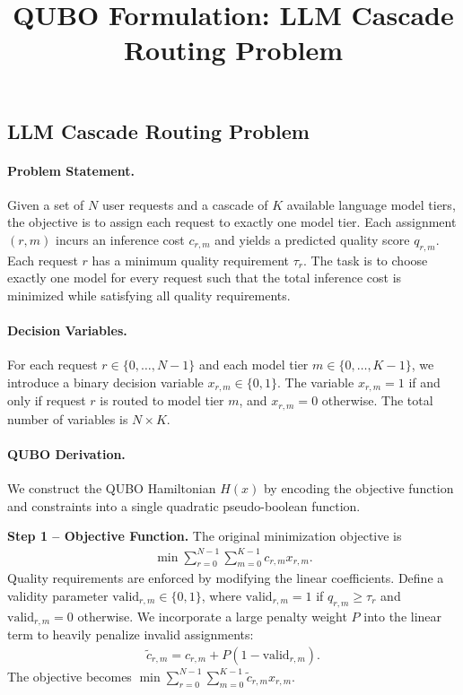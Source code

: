 \documentclass[12pt]{article}
\title{QUBO Formulation: LLM Cascade Routing Problem}
\date{}
\begin{document}
\maketitle

\subsection*{LLM Cascade Routing Problem}

\paragraph{Problem Statement.}
Given a set of $N$ user requests and a cascade of $K$ available language model tiers, the objective is to assign each request to exactly one model tier. Each assignment $(r, m)$ incurs an inference cost $c_{r,m}$ and yields a predicted quality score $q_{r,m}$. Each request $r$ has a minimum quality requirement $\tau_r$. The task is to choose exactly one model for every request such that the total inference cost is minimized while satisfying all quality requirements.

\paragraph{Decision Variables.}
For each request $r \in \{0, \dots, N-1\}$ and each model tier $m \in \{0, \dots, K-1\}$, we introduce a binary decision variable $x_{r,m} \in \{0, 1\}$. The variable $x_{r,m} = 1$ if and only if request $r$ is routed to model tier $m$, and $x_{r,m} = 0$ otherwise. The total number of variables is $N \times K$.

\paragraph{QUBO Derivation.}
We construct the QUBO Hamiltonian $H(x)$ by encoding the objective function and constraints into a single quadratic pseudo-boolean function.

\textbf{Step 1 -- Objective Function.} The original minimization objective is
\begin{align}
    \min \sum_{r=0}^{N-1} \sum_{m=0}^{K-1} c_{r,m} x_{r,m}.
\end{align}
Quality requirements are enforced by modifying the linear coefficients. Define a validity parameter $\text{valid}_{r,m} \in \{0, 1\}$, where $\text{valid}_{r,m} = 1$ if $q_{r,m} \ge \tau_r$ and $\text{valid}_{r,m} = 0$ otherwise. We incorporate a large penalty weight $P$ into the linear term to heavily penalize invalid assignments:
\begin{align}
    \tilde{c}_{r,m} = c_{r,m} + P(1 - \text{valid}_{r,m}).
\end{align}
The objective becomes $\min \sum_{r=0}^{N-1} \sum_{m=0}^{K-1} \tilde{c}_{r,m} x_{r,m}$.
\end{document}
